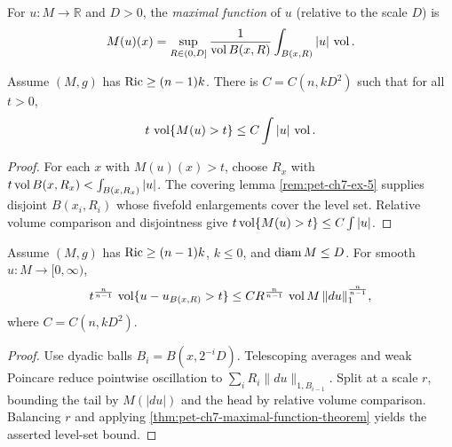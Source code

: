 \begin{definition}
  \label{def:pet-ch7-maximal-function}
  For $u:M\to\mathbb{R}$ and $D>0$, the \emph{maximal function} of $u$ (relative to
  the scale $D$) is
  \[
    M(u)(x)=\sup_{R\in(0,D]}\frac{1}{\operatorname{vol} B(x,R)}\int_{B(x,R)}|u|\,\operatorname{vol}.
  \]
\end{definition}

\begin{theorem}
  \label{thm:pet-ch7-maximal-function-theorem}
  Assume $(M,g)$ has $\operatorname{Ric}\ge(n-1)k$. There is $C=C(n,kD^2)$ such that for all
  $t>0$,
  \[
    t\,\operatorname{vol}\{M(u)>t\}\le C\int|u|\,\operatorname{vol}.
  \]
\end{theorem}
\begin{proof}
  \sketch
  For each \(x\) with \(M(u)(x)>t\), choose \(R_x\) with \(t\operatorname{vol} B(x,R_x)<\int_{B(x,R_x)}|u|\). The covering lemma \cref{rem:pet-ch7-ex-5} supplies disjoint \(B(x_i,R_i)\) whose fivefold enlargements cover the level set. Relative volume comparison and disjointness give \(t\operatorname{vol}\{M(u)>t\}\le C\int|u|\).
\end{proof}

\begin{theorem}
  \label{thm:pet-ch7-weak-poincare-sobolev-estimate}
  Assume $(M,g)$ has $\operatorname{Ric}\ge(n-1)k$, $k\le0$, and $\operatorname{diam} M\le D$. For smooth
  $u:M\to[0,\infty)$,
  \[
    t^{\frac{n}{n-1}}\,\operatorname{vol}\{u-u_{B(x,R)}>t\}
    \le C R^{\frac{n}{n-1}}\,\operatorname{vol} M\,\|du\|_1^{\frac{n}{n-1}},
  \]
  where $C=C(n,kD^2)$.
\end{theorem}
\begin{proof}
  \sketch
  Use dyadic balls \(B_i=B(x,2^{-i}D)\). Telescoping averages and weak Poincare reduce pointwise oscillation to \(\sum_iR_i\|du\|_{1,B_{i-1}}\). Split at a scale \(r\), bounding the tail by \(M(|du|)\) and the head by relative volume comparison. Balancing \(r\) and applying \cref{thm:pet-ch7-maximal-function-theorem} yields the asserted level-set bound.
\end{proof}

